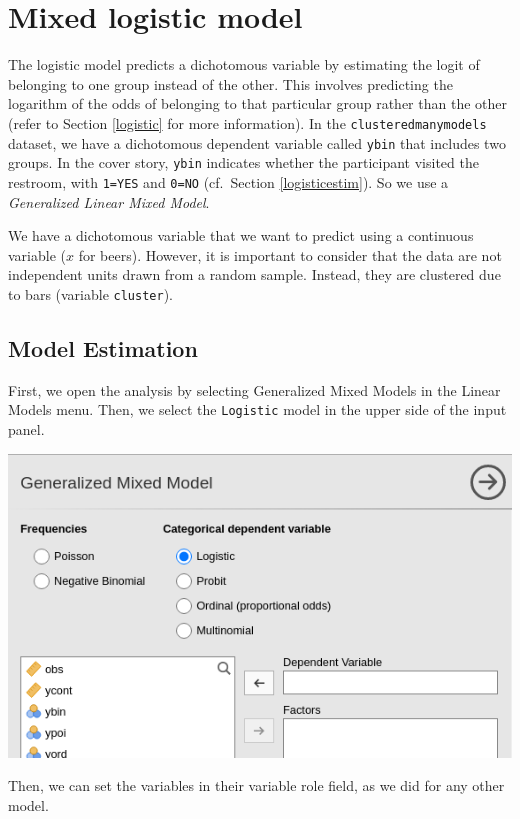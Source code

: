 \documentclass[
]{book}
\begin{document}
\hypertarget{mixed-logistic-model}{%
\section{Mixed logistic model}\label{mixed-logistic-model}}

The logistic model predicts a dichotomous variable by estimating the logit of belonging to one group instead of the other. This involves predicting the logarithm of the odds of belonging to that particular group rather than the other (refer to Section \ref{logistic} for more information). In the \texttt{clusteredmanymodels} dataset, we have a dichotomous dependent variable called \texttt{ybin} that includes two groups. In the cover story, \texttt{ybin} indicates whether the participant visited the restroom, with \texttt{1=YES} and \texttt{0=NO} (cf.~Section \ref{logisticestim}). So we use a \emph{Generalized Linear Mixed Model}.

We have a dichotomous variable that we want to predict using a continuous variable (\(x\) for beers). However, it is important to consider that the data are not independent units drawn from a random sample. Instead, they are clustered due to bars (variable \texttt{cluster}).

\hypertarget{model-estimation-4}{%
\subsection{Model Estimation}\label{model-estimation-4}}

First, we open the analysis by selecting {Generalized Mixed Models} in the {Linear Models} menu. Then, we select the \texttt{Logistic} model in the upper side of the input panel.

\includegraphics[width=0.8\linewidth]{bookletpics/5_logistic_input1}

Then, we can set the variables in their variable role field, as we did for any other model.
\end{document}
